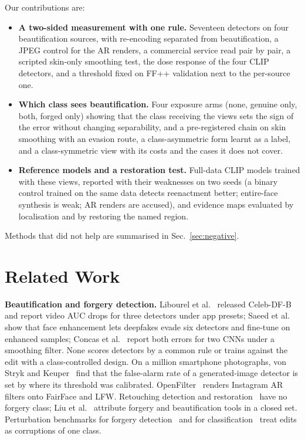 \documentclass[conference]{IEEEtran}
\begin{document}
Our contributions are:
\begin{itemize}
\item \textbf{A two-sided measurement with one rule.} Seventeen detectors on four beautification sources, with re-encoding
separated from beautification, a JPEG control for the AR renders, a commercial service read pair by pair, a scripted skin-only
smoothing test, the dose response of the four CLIP detectors, and a threshold fixed on FF++ validation next to the per-source one.
\item \textbf{Which class sees beautification.} Four exposure arms (none, genuine only, both, forged only) showing that the class
receiving the views sets the sign of the error without changing separability, and a pre-registered chain on skin smoothing with
an evasion route, a class-asymmetric form learnt as a label, and a class-symmetric view with its costs and the cases it does not
cover.
\item \textbf{Reference models and a restoration test.} Full-data CLIP models trained with these views, reported with their
weaknesses on two seeds (a binary control trained on the same data detects reenactment better; entire-face synthesis is weak; AR
renders are accused), and evidence maps evaluated by localisation and by restoring the named region.
\end{itemize}
Methods that did not help are summarised in Sec.~\ref{sec:negative}.

\section{Related Work}
\textbf{Beautification and forgery detection.} Libourel et al.~\cite{libourel2024} released Celeb-DF-B and report video AUC
drops for three detectors under app presets; Saeed et al.~\cite{saeed2025} show that face enhancement lets deepfakes evade six
detectors and fine-tune on enhanced samples; Concas et al.~\cite{concas2025} report both errors for two CNNs under a smoothing
filter. None scores detectors by a common rule or trains against the edit with a class-controlled design. On a million
smartphone photographs, von Stryk and Keuper~\cite{laionmobile2026} find that the false-alarm rate of a generated-image detector
is set by where its threshold was calibrated. OpenFilter~\cite{openfilter2022} renders Instagram AR filters onto FairFace and LFW.
Retouching detection and restoration~\cite{bharati2016,jain2018,wang2019photoshop,
retouchingffhq,frrffusion,mofrr,reface} have no forgery class; Liu et al.~\cite{miea2026} attribute forgery and beautification
tools in a closed set. Perturbation benchmarks for forgery detection~\cite{deeperforensics2020,moire2025} and for
classification~\cite{hendrycks2019} treat edits as corruptions of one class.
\end{document}
